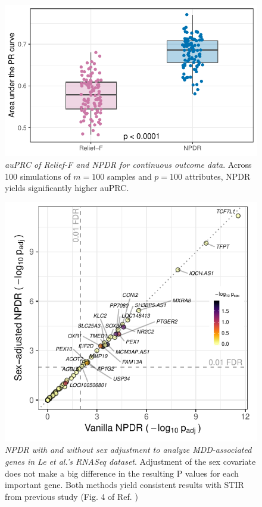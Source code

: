 \documentclass{article}
\begin{document}
\begin{figure}[h]%
\centerline{\includegraphics[]{../figs/pr_compare_qtrait.pdf}}
\caption{\emph{auPRC of Relief-F and NPDR for continuous outcome data}. Across 100 simulations of $m = 100$ samples and $p = 100$ attributes, NPDR yields significantly higher auPRC.}
\label{fig:auPRC_qtrait}
\end{figure}



\begin{figure}[h]%
\centerline{\includegraphics[]{../figs/jerzy_npdrs_mdd.pdf}}
\caption{\emph{NPDR with and without sex adjustment to analyze MDD-associated genes in Le et al.'s RNASeq dataset}. Adjustment of the sex covariate does not make a big difference in the resulting P values for each important gene. Both methods yield consistent results with STIR from previous study (Fig. 4 of Ref. \cite{stir})}
\label{fig:jerzy_npdrs_mdd}
\end{figure}




\end{document}
